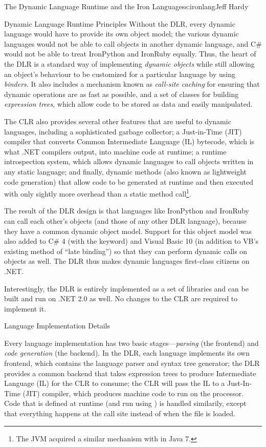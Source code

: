 \begin{aosachapter}{The Dynamic Language Runtime and the Iron Languages}{s:ironlang}{Jeff Hardy}
\begin{aosasect1}{Dynamic Language Runtime Principles}
Without the DLR, every dynamic language would have to provide its own object
model; the various dynamic languages would not be able to call objects in
another dynamic language, and C\# would not be able to treat IronPython and
IronRuby equally. Thus, the heart of the DLR is a standard way of implementing
\emph{dynamic objects} while still allowing an object's behaviour to be
customized for a particular language by using \emph{binders}. It also includes
a mechanism known as \emph{call-site caching} for ensuring that dynamic
operations are as fast as possible, and a set of classes for building
\emph{expression trees}, which allow code to be stored as data and easily
manipulated.

The CLR also provides several other features that are useful to dynamic
languages, including a sophisticated garbage collector; a Just-in-Time (JIT)
compiler that converts Common Intermediate Language (IL) bytecode, which is
what .NET compilers output, into machine code at runtime; a runtime
introspection system, which allows dynamic languages to call objects written in
any static language; and finally, dynamic methods (also known as lightweight
code generation) that allow code to be generated at runtime and then executed
with only sightly more overhead than a static method call\footnote{The JVM
acquired a similar mechanism with  in Java 7.}.

The result of the DLR design is that languages like IronPython and IronRuby can
call each other's objects (and those of any other DLR language), because they
have a common dynamic object model. Support for this object model was also
added to C\# 4 (with the  keyword) and Visual Basic 10 (in
addition to VB's existing method of ``late binding'') so that they can perform
dynamic calls on objects as well. The DLR thus makes dynamic languages
first-class citizens on .NET.

Interestingly, the DLR is entirely implemented as a set of libraries and can be
built and run on .NET 2.0 as well. No changes to the CLR are required to
implement it.

\end{aosasect1}

\begin{aosasect1}{Language Implementation Details}

Every language implementation has two basic stages---\emph{parsing} (the
frontend) and \emph{code generation} (the backend). In the DLR, each language
implements its own frontend, which contains the language parser and syntax tree
generator; the DLR provides a common backend that takes expression trees to
produce Intermediate Language (IL) for the CLR to consume; the CLR will pass
the IL to a Just-In-Time (JIT) compiler, which produces machine code to run on
the processor. Code that is defined at runtime (and run using ) is
handled similarily, except that everything happens at the  call site
instead of when the file is loaded.


\end{aosasect1}
\end{aosachapter}

